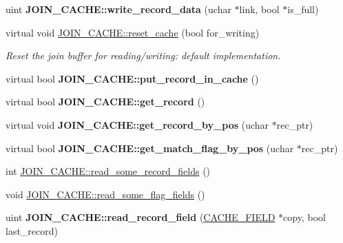 \begin{DoxyCompactItemize}
\item 
\mbox{\label{group__Query__Optimizer_ga264fccad2a1ea9271e785cb8e38432ca}} 
uint {\bfseries J\+O\+I\+N\+\_\+\+C\+A\+C\+H\+E\+::write\+\_\+record\+\_\+data} (uchar $\ast$link, bool $\ast$is\+\_\+full)
\item 
virtual void \mbox{\hyperlink{group__Query__Optimizer_gad54e309ac7f0fd377d7a422ea54f59f8}{J\+O\+I\+N\+\_\+\+C\+A\+C\+H\+E\+::reset\+\_\+cache}} (bool for\+\_\+writing)
\begin{DoxyCompactList}\small\item\em Reset the join buffer for reading/writing\+: default implementation. \end{DoxyCompactList}\item 
\mbox{\label{group__Query__Optimizer_ga6d55336d67514ad78878149c80528e33}} 
virtual bool {\bfseries J\+O\+I\+N\+\_\+\+C\+A\+C\+H\+E\+::put\+\_\+record\+\_\+in\+\_\+cache} ()
\item 
\mbox{\label{group__Query__Optimizer_ga6f7ee01f20498b51114e1afb40806685}} 
virtual bool {\bfseries J\+O\+I\+N\+\_\+\+C\+A\+C\+H\+E\+::get\+\_\+record} ()
\item 
\mbox{\label{group__Query__Optimizer_gaccb8c25ca124e9aeaddf1442c6167e87}} 
virtual void {\bfseries J\+O\+I\+N\+\_\+\+C\+A\+C\+H\+E\+::get\+\_\+record\+\_\+by\+\_\+pos} (uchar $\ast$rec\+\_\+ptr)
\item 
\mbox{\label{group__Query__Optimizer_gab7955ae39f556d0141a6eb11e03a4b1e}} 
virtual bool {\bfseries J\+O\+I\+N\+\_\+\+C\+A\+C\+H\+E\+::get\+\_\+match\+\_\+flag\+\_\+by\+\_\+pos} (uchar $\ast$rec\+\_\+ptr)
\item 
int \mbox{\hyperlink{group__Query__Optimizer_ga20c8bd509fba4099611e8a7b01c115d8}{J\+O\+I\+N\+\_\+\+C\+A\+C\+H\+E\+::read\+\_\+some\+\_\+record\+\_\+fields}} ()
\item 
void \mbox{\hyperlink{group__Query__Optimizer_gafa19cecc5eccee0ff1285c62769daf39}{J\+O\+I\+N\+\_\+\+C\+A\+C\+H\+E\+::read\+\_\+some\+\_\+flag\+\_\+fields}} ()
\item 
\mbox{\label{group__Query__Optimizer_ga6967798983487fe2f83ed405b5b2d1f4}} 
uint {\bfseries J\+O\+I\+N\+\_\+\+C\+A\+C\+H\+E\+::read\+\_\+record\+\_\+field} (\mbox{\hyperlink{structst__cache__field}{C\+A\+C\+H\+E\+\_\+\+F\+I\+E\+LD}} $\ast$copy, bool last\+\_\+record)

\end{DoxyCompactItemize}
